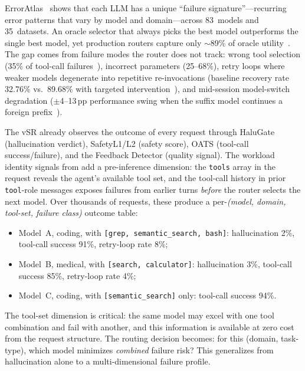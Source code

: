 \begin{opportunity}
\label{opp:failure-routing}
ErrorAtlas~\cite{erroratlas2026} shows that each LLM has a unique
``failure signature''---recurring error patterns that vary by model
and domain---across 83~models and 35~datasets.  An oracle selector
that always picks the best model outperforms the single best model,
yet production routers capture only $\sim$89\% of oracle
utility~\cite{llmrouterbench2026}.  The gap comes from failure modes
the router does not track: wrong tool selection (35\% of tool-call
failures~\cite{agenticfaults2026}), incorrect parameters
(25--68\%), retry loops where weaker models degenerate into
repetitive re-invocations (baseline recovery rate 32.76\% vs.\ 89.68\%
with targeted intervention~\cite{paladin2025}), and mid-session
model-switch degradation ($\pm$4--13\,pp performance swing when
the suffix model continues a foreign prefix~\cite{handoffdrift2026}).

The vSR already observes the outcome of every request through
HaluGate (hallucination verdict), SafetyL1/L2 (safety score),
OATS (tool-call success/failure), and the Feedback Detector (quality
signal).  The workload identity signals from
 add a pre-inference dimension: the
\texttt{tools} array in the request reveals the agent's available
tool set, and the tool-call history in prior \texttt{tool}-role
messages exposes failures from earlier turns \emph{before} the
router selects the next model.  Over thousands of requests, these
produce a per-\emph{(model, domain, tool-set, failure class)}
outcome table:
\begin{itemize}[nosep]
  \item Model~A, coding, with \texttt{[grep, semantic\_search,
        bash]}: hallucination 2\%, tool-call success 91\%,
        retry-loop rate 8\%;
  \item Model~B, medical, with \texttt{[search, calculator]}:
        hallucination 3\%, tool-call success 85\%,
        retry-loop rate 4\%;
  \item Model~C, coding, with \texttt{[semantic\_search]} only:
        tool-call success 94\%.
\end{itemize}
The tool-set dimension is critical: the same model may excel with
one tool combination and fail with another, and this information is
available at zero cost from the request structure.
The routing decision becomes: for this (domain, task-type), which
model minimizes \emph{combined} failure risk?  This generalizes
 from hallucination alone to a
multi-dimensional failure profile.


\end{opportunity}
